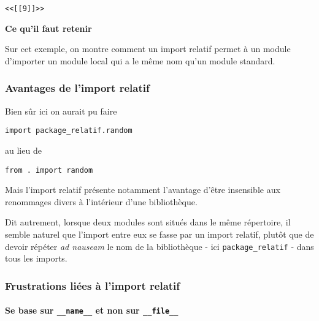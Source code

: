     \begin{Verbatim}[commandchars=\\\{\}]
<<[[9]]>>

    \end{Verbatim}

    \textbf{Ce qu'il faut retenir}

Sur cet exemple, on montre comment un import relatif permet à un module
d'importer un module local qui a le même nom qu'un module standard.

    \hypertarget{avantages-de-limport-relatif}{%
\subsubsection{Avantages de l'import
relatif}\label{avantages-de-limport-relatif}}

    Bien sûr ici on aurait pu faire

\begin{verbatim}
import package_relatif.random
\end{verbatim}

au lieu de

\begin{verbatim}
from . import random
\end{verbatim}

    Mais l'import relatif présente notamment l'avantage d'être insensible
aux renommages divers à l'intérieur d'une bibliothèque.

    Dit autrement, lorsque deux modules sont situés dans le même répertoire,
il semble naturel que l'import entre eux se fasse par un import relatif,
plutôt que de devoir répéter \emph{ad nauseam} le nom de la bibliothèque
- ici \texttt{package\_relatif} - dans tous les imports.

    \hypertarget{frustrations-liuxe9es-uxe0-limport-relatif}{%
\subsubsection{Frustrations liées à l'import
relatif}\label{frustrations-liuxe9es-uxe0-limport-relatif}}

    \hypertarget{se-base-sur-__name__-et-non-sur-__file__}{%
\paragraph{\texorpdfstring{Se base sur \texttt{\_\_name\_\_} et non sur
\texttt{\_\_file\_\_}}{Se base sur \_\_name\_\_ et non sur \_\_file\_\_}}\label{se-base-sur-__name__-et-non-sur-__file__}}

